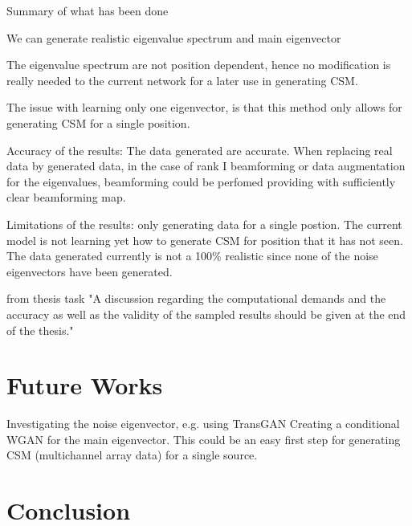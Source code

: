 \documentclass[11pt,a4paper,twoside]{report}
\begin{document}
Summary of what has been done

We can generate realistic eigenvalue spectrum and main eigenvector

The eigenvalue spectrum are not position dependent, hence no modification is really needed to the current network for a later use in generating CSM.

The issue with learning only one eigenvector, is that this method only allows for generating CSM for a single position.

Accuracy of the results: The data generated are accurate. When replacing real data by generated data, in the case of rank I beamforming or data augmentation for the eigenvalues, beamforming could be perfomed providing with sufficiently clear beamforming map.

Limitations of the results: only generating data for a single postion. The current model is not learning yet how to generate CSM for position that it has not seen. The data generated currently is not a 100\% realistic since none of the noise eigenvectors have been generated.    

from thesis task "A discussion regarding the computational demands and the accuracy as well as the validity of the sampled results should be given at the end of the thesis."



\chapter{Future Works}

Investigating the noise eigenvector, e.g. using TransGAN
Creating a conditional WGAN for the main eigenvector. This could be an easy first step for generating CSM (multichannel array data) for a single source.

\chapter{Conclusion}



\cleardoublepage

\appendix
\fancyhead[LO]{\rightmark}
\fancyhead[RO]{\scshape\appendixname\ \thechapter}
\fancyhead[LE]{\scshape\appendixname\ \thechapter}
\fancyhead[RE]{\textsc{\leftmark}}
\end{document}

